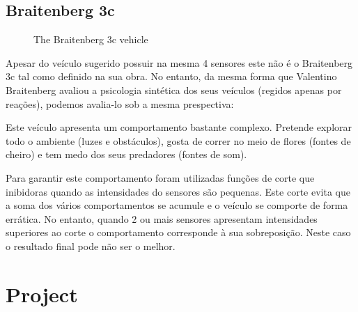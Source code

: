 \documentclass[a4paper]{article}
\begin{document}
\subsection{Braitenberg 3c}
\begin{figure}[h]
	\centering
	
	\caption{The Braitenberg 3c vehicle}
\end{figure}
Apesar do veículo sugerido possuir na mesma 4 sensores este não é o Braitenberg 3c tal como definido na sua obra.
No entanto, da mesma forma que Valentino Braitenberg avaliou a psicologia sintética dos seus veículos (regidos apenas por reações),
podemos avalia-lo sob a mesma prespectiva:

Este veículo apresenta um comportamento bastante complexo. Pretende explorar todo o ambiente (luzes e obstáculos), gosta de 
correr no meio de flores (fontes de cheiro) e tem medo dos seus predadores (fontes de som). 

Para garantir este comportamento foram utilizadas funções de corte que inibidoras quando as intensidades do sensores são pequenas.
Este corte evita que a soma dos vários comportamentos se acumule e o veículo se comporte de forma errática.
No entanto, quando 2 ou mais sensores apresentam intensidades superiores ao corte o comportamento corresponde à sua sobreposição.
Neste caso o resultado final pode não ser o melhor.


\cleardoublepage
\section{Project}
\end{document}
